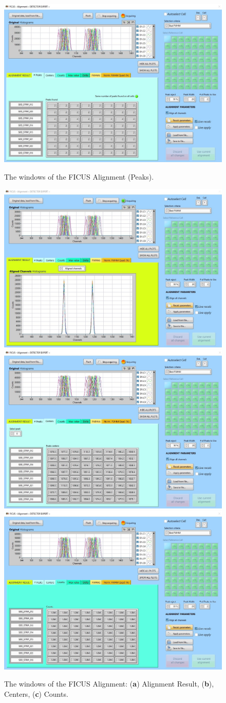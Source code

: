 \documentclass[a4paper,12pt,oneside,pdflatex,italian,final,twocolumn]{article}
\begin{document}
\begin{figure}[h]
\centering
{\includegraphics[width=.7\textwidth]{Capture24.jpg}} \quad
\caption{The windows of the FICUS Alignment (Peaks).}\label{fig:fig20}
\end{figure}

\clearpage

\begin{figure}[h]
\centering
\subfloat
{\includegraphics[width=.6\textwidth]{Capture23.jpg}} \\
\subfloat
{\includegraphics[width=.6\textwidth]{Capture25.jpg}} \\
\subfloat
{\includegraphics[width=.6\textwidth]{Capture26.jpg}} \\
\caption{The windows of the FICUS Alignment: (\textbf{a}) Alignment Result, (\textbf{b}), Centers, (\textbf{c}) Counts.}\label{fig:fig21}
\end{figure}
\end{document}
